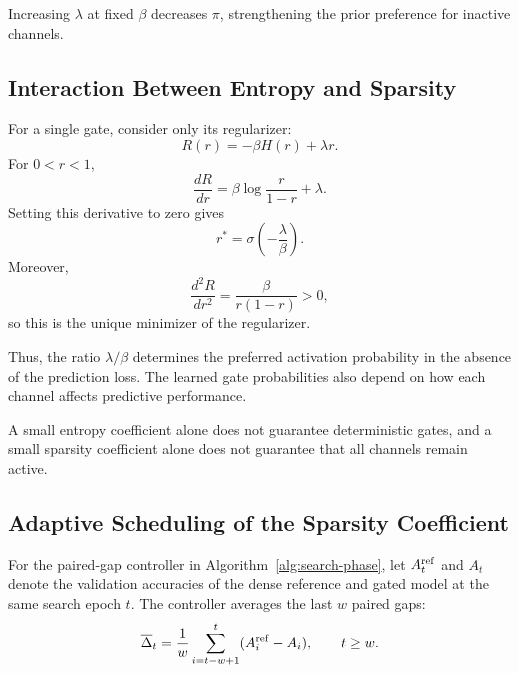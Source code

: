 \documentclass[sigplan,screen]{acmart}
\begin{document}
Increasing $\lambda$ at fixed $\beta$ decreases $\pi$,
strengthening the prior preference for inactive channels.

\subsection{Interaction Between Entropy and Sparsity}

For a single gate, consider only its regularizer:
\begin{equation}
R(r)=-\beta H(r)+\lambda r.
\end{equation}
For $0<r<1$,
\begin{equation}
\frac{dR}{dr}
=
\beta\log\frac{r}{1-r}+\lambda.
\end{equation}
Setting this derivative to zero gives
\begin{equation}
r^*
=
\sigma\left(-\frac{\lambda}{\beta}\right).
\end{equation}
Moreover,
\begin{equation}
\frac{d^2R}{dr^2}
=
\frac{\beta}{r(1-r)}>0,
\end{equation}
so this is the unique minimizer of the regularizer.

Thus, the ratio $\lambda/\beta$ determines the preferred
activation probability in the absence of the prediction
loss. The learned gate probabilities also depend on how
each channel affects predictive performance.

A small entropy coefficient alone does not guarantee
deterministic gates, and a small sparsity coefficient alone
does not guarantee that all channels remain active.

\subsection{Adaptive Scheduling of the Sparsity Coefficient}
\label{sec:adaptive-sparsity}

For the paired-gap controller in Algorithm~\ref{alg:search-phase},
let $A_t^{\rm ref}$ and $A_t$ denote the validation accuracies of the
dense reference and gated model at the same search epoch $t$.
The controller averages the last $w$ paired gaps:
\begin{equation}
\overline\Delta_t
=\frac{1}{w}\sum_{i=t-w+1}^{t}(A_i^{\rm ref}-A_i),
\qquad t\geq w.
\end{equation}
\end{document}
